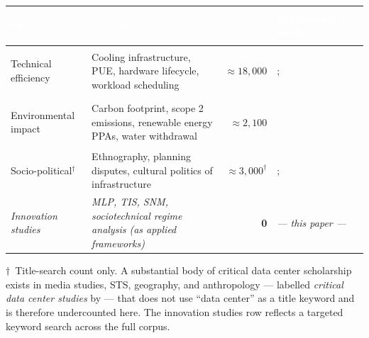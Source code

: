 

\bigskip
\begin{fullwidth}
\footnotesize
{}
\setlength{\tabcolsep}{4pt}
\renewcommand{\arraystretch}{1.25}
\begin{tabularx}{\linewidth}{>{\bfseries\raggedright}p{2.4cm}Xrp{3.8cm}}
\toprule
\rowcolor{dcblue}
\textcolor{white}{\textbf{Silo}} &
\textcolor{white}{\textbf{Core focus}} &
\textcolor{white}{\textbf{$\approx n$}} &
\textcolor{white}{\textbf{Representative works}} \\
\midrule
Technical efficiency &
  Cooling infrastructure, PUE, hardware lifecycle, workload scheduling &
  ${\approx}18{,}000$ &
  \citet{dayarathna2015data}; \citet{masanet2020recalibrating} \\
\addlinespace[2pt]
\rowcolor{dcgray}
Environmental impact &
  Carbon footprint, scope 2 emissions, renewable energy PPAs, water withdrawal &
  ${\approx}2{,}100$ &
  \citet{iea2024electricity} \\
\addlinespace[2pt]
Socio-political$^\dagger$ &
  Ethnography, planning disputes, cultural politics of infrastructure &
  ${\approx}3{,}000^\dagger$ &
  \citet{blum2012tubes}; \citet{vonderau2019storing} \\
\addlinespace[4pt]
\rowcolor{dcaccent!12}
\textit{Innovation studies} &
  \textit{MLP, TIS, SNM, sociotechnical regime analysis (as applied frameworks)} &
  \textcolor{dcaccent}{\textbf{0}} &
  \textit{--- this paper ---} \\
\bottomrule
\end{tabularx}
\smallskip
{\footnotesize $\dagger$~Title-search count only. A substantial body of critical data center scholarship exists in media studies, STS, geography, and anthropology --- labelled \textit{critical data center studies} by \citet{edwards2025making} --- that does not use ``data center'' as a title keyword and is therefore undercounted here. The innovation studies row reflects a targeted keyword search across the full corpus.}
\end{fullwidth}
\bigskip

